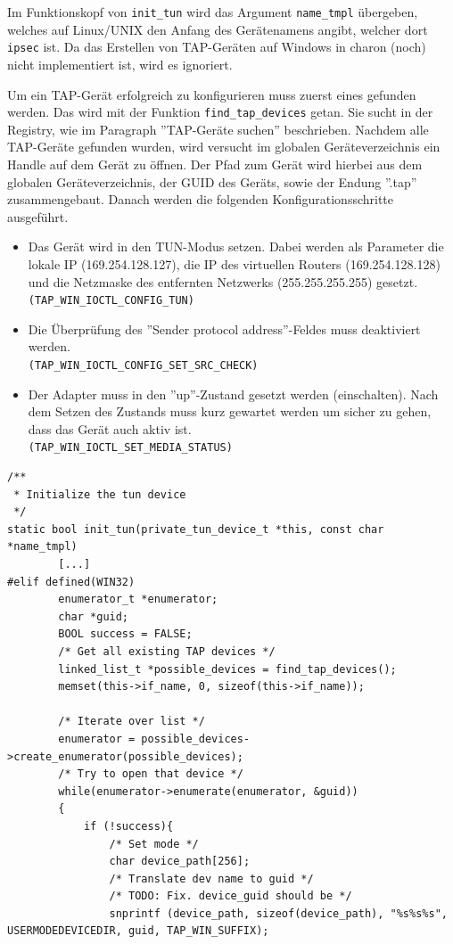 {Im Funktionskopf von \texttt{init\_tun} wird das Argument \texttt{name\_tmpl} übergeben,
welches auf Linux/UNIX den Anfang des Gerätenamens angibt, welcher dort \texttt{ipsec}
ist. Da das Erstellen von TAP-Geräten auf Windows in charon (noch) nicht implementiert
ist, wird es ignoriert.

Um ein TAP-Gerät erfolgreich zu konfigurieren muss zuerst eines gefunden werden. Das wird mit der Funktion
\texttt{find\_tap\_devices} getan. Sie sucht in der Registry, wie im Paragraph ''TAP-Geräte suchen''
beschrieben.
Nachdem alle TAP-Geräte gefunden wurden, wird versucht im globalen Geräteverzeichnis ein Handle
auf dem Gerät zu öffnen. Der Pfad zum Gerät wird hierbei aus dem globalen Geräteverzeichnis, der GUID des Geräts,
sowie der Endung ''.tap'' zusammengebaut.
Danach werden die folgenden Konfigurationsschritte ausgeführt.
\begin{itemize}
\item Das Gerät wird in den TUN-Modus setzen. Dabei werden als Parameter
die lokale IP (169.254.128.127), die IP des virtuellen Routers (169.254.128.128)
und die Netzmaske des entfernten Netzwerks (255.255.255.255) gesetzt. 
\texttt{(TAP\_WIN\_IOCTL\_CONFIG\_TUN)}
\item Die Überprüfung des ''Sender protocol address''-Feldes muss deaktiviert werden.\\
\texttt{(TAP\_WIN\_IOCTL\_CONFIG\_SET\_SRC\_CHECK)}
\item Der Adapter muss in den ''up''-Zustand gesetzt werden (einschalten). 
Nach dem Setzen des Zustands muss kurz gewartet werden um sicher zu gehen, dass das Gerät auch aktiv ist.\\
\texttt{(TAP\_WIN\_IOCTL\_SET\_MEDIA\_STATUS)}
\end{itemize}


\begin{lstlisting}[caption=Konfiguration eines TAP-Geräts,label=lst:tap-device-configuration]
/**
 * Initialize the tun device
 */
static bool init_tun(private_tun_device_t *this, const char *name_tmpl)
        [...]
#elif defined(WIN32)
        enumerator_t *enumerator;
        char *guid;
        BOOL success = FALSE;
        /* Get all existing TAP devices */
        linked_list_t *possible_devices = find_tap_devices();
        memset(this->if_name, 0, sizeof(this->if_name));

        /* Iterate over list */
        enumerator = possible_devices->create_enumerator(possible_devices);
        /* Try to open that device */
        while(enumerator->enumerate(enumerator, &guid))
        {
            if (!success){
                /* Set mode */
                char device_path[256];
                /* Translate dev name to guid */
                /* TODO: Fix. device_guid should be */
                snprintf (device_path, sizeof(device_path), "%s%s%s", USERMODEDEVICEDIR, guid, TAP_WIN_SUFFIX);


\end{lstlisting}}
